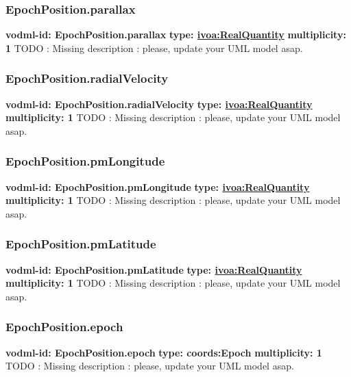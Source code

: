     \subsubsection{EpochPosition.parallax}
      \textbf{vodml-id: EpochPosition.parallax} \newline
      \textbf{type: \hyperref[sect:ivoa]{ivoa:RealQuantity}} \newline
      \textbf{multiplicity: 1} \newline
      TODO : Missing description : please, update your UML model asap.

    \subsubsection{EpochPosition.radialVelocity}
      \textbf{vodml-id: EpochPosition.radialVelocity} \newline
      \textbf{type: \hyperref[sect:ivoa]{ivoa:RealQuantity}} \newline
      \textbf{multiplicity: 1} \newline
      TODO : Missing description : please, update your UML model asap.

    \subsubsection{EpochPosition.pmLongitude}
      \textbf{vodml-id: EpochPosition.pmLongitude} \newline
      \textbf{type: \hyperref[sect:ivoa]{ivoa:RealQuantity}} \newline
      \textbf{multiplicity: 1} \newline
      TODO : Missing description : please, update your UML model asap.

    \subsubsection{EpochPosition.pmLatitude}
      \textbf{vodml-id: EpochPosition.pmLatitude} \newline
      \textbf{type: \hyperref[sect:ivoa]{ivoa:RealQuantity}} \newline
      \textbf{multiplicity: 1} \newline
      TODO : Missing description : please, update your UML model asap.

    \subsubsection{EpochPosition.epoch}
      \textbf{vodml-id: EpochPosition.epoch} \newline
      \textbf{type: coords:Epoch} \newline
      \textbf{multiplicity: 1} \newline
      TODO : Missing description : please, update your UML model asap.

